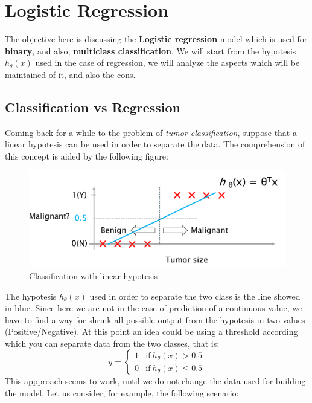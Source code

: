 \chapter{Logistic Regression}

The objective here is discussing the \textbf{Logistic regression} model which is used for \textbf{binary}, and also, \textbf{multiclass classification}. We will start from the hypotesis $h_\theta(x)$ used in the case of regression, we will analyze the aspects which will be maintained of it, and also the cons. 

\section{Classification vs Regression}
Coming back for a while to the problem of \textit{tumor classification}, suppose that a linear hypotesis can be used in order to separate the data. The comprehension of this concept is aided by the following figure: 
\begin{figure}[h]
    \centering
    \includegraphics[scale=0.5]{img/Class_vs_Reg.png}
    \caption{Classification with linear hypotesis}
\end{figure}
The hypotesis $h_\theta(x)$ used in order to separate the two class is the line showed in blue. Since here we are not in the case of prediction of a continuous value, we have to find a way for shrink all possible output from the hypotesis in two values (Positive/Negative). At this point an idea could be using a threshold according which you can separate data from the two classes, that is:
\begin{equation} \label{eq:criteria}
    y=\begin{cases}
        1&\text{if} \ h_\theta(x)>0.5\\
        0&\text{if} \ h_\theta(x)\le{0.5}
    \end{cases}
\end{equation}
This appproach seems to work, until we do not change the data used for building the model. Let us consider, for example, the following scenario:
